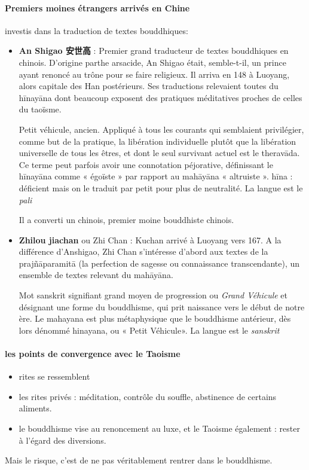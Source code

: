  \paragraph{Premiers moines étrangers arrivés en Chine }
investis dans la traduction de textes bouddhiques:
\begin{itemize}
    \item  	\textbf{An Shigao 安世高 }  : Premier grand traducteur de textes bouddhiques en chinois. D’origine parthe arsacide, An Shigao était, semble-t-il, un prince ayant renoncé au trône pour se faire religieux. Il arriva en 148 à Luoyang, alors capitale des Han postérieurs.
Ses traductions relevaient toutes du hīnayāna  dont beaucoup exposent des pratiques méditatives proches de celles du taoïsme.
\begin{Def}[hīnayāna]
    Petit véhicule, ancien. Appliqué à tous les courants qui semblaient privilégier, comme but de la pratique, la libération individuelle plutôt que la libération universelle de tous les êtres, et dont le seul survivant actuel est le theravāda. Ce terme peut parfois avoir une connotation péjorative, définissant le hīnayāna comme « égoïste » par rapport au mahāyāna « altruiste ». hīna : déficient mais on le traduit par petit pour plus de neutralité.
    La langue est le \textit{pali}
\end{Def}
Il a converti un chinois, premier moine bouddhiste chinois.
 \item 	\textbf{Zhilou jiachan}     ou Zhi Chan   : Kuchan arrivé à Luoyang vers 167. A la différence d’Anshigao, Zhi Chan s’intéresse d’abord aux textes de la prajñāparamitā (la perfection de sagesse ou connaissance transcendante), un ensemble de textes relevant du mahāyāna.
\begin{Def}[mahāyāna]
    Mot sanskrit signifiant grand moyen de progression ou \textit{Grand Véhicule} et désignant une forme du bouddhisme, qui prit naissance vers le début de notre ère. Le mahayana est plus métaphysique que le bouddhisme antérieur, dès lors dénommé hinayana, ou « Petit Véhicule». La langue est le \textit{sanskrit}
\end{Def}
\end{itemize}


\paragraph{les points de convergence avec le Taoisme}
\begin{itemize}
    \item rites se ressemblent
    \item les rites privés : méditation, contrôle du souffle, abstinence de certains aliments.
    \item le bouddhisme vise au renoncement au luxe, et le Taoisme également : rester à l'égard des diversions. 
\end{itemize}
Mais le risque, c'est de ne pas véritablement rentrer dans le bouddhisme.


